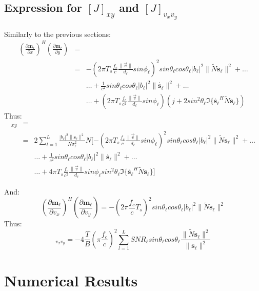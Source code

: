 \documentclass[10pt,a4paper]{report}
\begin{document}
\section{Expression for $[J]_{x y}$ and $[J]_{v_x v_y}$ }
Similarly to the previous sections:
\begin{eqnarray}
\left(\frac{\partial \mathbf{m_\ell }}{\partial x}\right)^H\left(\frac{\partial \mathbf{m_\ell }}{\partial y}\right) &=& \\
&=& -(2 \pi T_s \frac{f_c}{c}\frac{\|\vec{v}\|}{d_\ell }sin\phi_\ell )^2 sin\theta_\ell  cos\theta_\ell  |b_\ell |^2\|\tilde{N}\mathbf{s_\ell }\|^2 + \dots \nonumber\\
&&\dots + \frac{1}{c^2}sin \theta_\ell  cos\theta_\ell  |b_\ell |^2\|\mathbf{\dot{s_\ell }}\|^2 +\dots \nonumber \\
&&\dots + (2 \pi T_s \frac{f_c}{c^2} \frac{\|\vec{v}\|}{d_\ell }sin\phi_\ell )(j+2sin^2\theta_\ell \Im\{\mathbf{\dot{s_\ell }}^H\tilde{N}\mathbf{s_\ell }\})\nonumber
\end{eqnarray}
Thus:
\begin{eqnarray}
[J]_{xy} &=& \\
&=& 2 \sum_{l=1}^L \frac{|b_\ell |^2\|\mathbf{s_\ell }\|^2}{N\sigma_\ell ^2}N[-(2 \pi T_s \frac{f_c}{c}\frac{\|\vec{v}\|}{d_\ell }sin\phi_\ell )^2 sin\theta_\ell  cos\theta_\ell  |b_\ell |^2\|\tilde{N}\mathbf{s_\ell }\|^2 + \dots \nonumber\\
&&\dots + \frac{1}{c^2}sin \theta_\ell  cos\theta_\ell  |b_\ell |^2\|\mathbf{\dot{s_\ell }}\|^2 +\dots \nonumber \\
&&\dots + 4 \pi T_s \frac{f_c}{c^2} \frac{\|\vec{v}\|}{d_\ell }sin\phi_\ell  sin^2\theta_\ell \Im\{\mathbf{\dot{s_\ell }}^H\tilde{N}\mathbf{s_\ell }\}]\nonumber
\end{eqnarray}

And:
\begin{equation}
\left(\frac{\partial \mathbf{m_\ell }}{\partial v_x}\right)^H\left(\frac{\partial \mathbf{m_\ell }}{\partial v_y}\right) =
 - (2 \pi \frac{f_c}{c} T_s)^2 sin\theta_\ell  cos \theta_\ell  |b_\ell |^2 \|\tilde{N}\mathbf{s_\ell }\|^2 
 \end{equation}
Thus:
\begin{equation}
[J]_{v_xv_y} = -4\frac{T}{B} ( \pi \frac{f_c}{c})^2\sum_{l=1}^L {SNR}_\ell   sin\theta_\ell  cos \theta_\ell   \frac{\|\tilde{N}\mathbf{s_\ell }\|^2}{\|\mathbf{s_\ell }\|^2}
\end{equation}
\chapter{Numerical Results}
\end{document}
